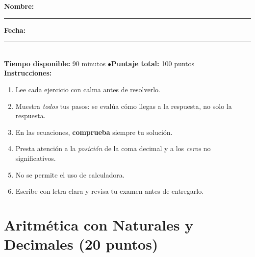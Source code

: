 \documentclass[12pt, letterpaper]{article}
\begin{document}


\vspace{4pt}
\begin{cuadroinfo}
  \small
  \textbf{Nombre:} \rule{0.55\linewidth}{0.4pt} \quad \textbf{Fecha:} \rule{0.15\linewidth}{0.4pt} \\[6pt]
  \textbf{Tiempo disponible:} 90 minutos \quad$\bullet$\quad \textbf{Puntaje total:} 100 puntos \\[4pt]
  \textbf{Instrucciones:}
  \begin{enumerate}[leftmargin=*]
    \item Lee cada ejercicio con calma antes de resolverlo.
    \item Muestra \emph{todos} tus pasos: se evalúa cómo llegas a la respuesta, no solo la respuesta.
    \item En las ecuaciones, \textbf{comprueba} siempre tu solución.
    \item Presta atención a la \emph{posición} de la coma decimal y a los \emph{ceros} no significativos.
    \item No se permite el uso de calculadora.
    \item Escribe con letra clara y revisa tu examen antes de entregarlo.
  \end{enumerate}
\end{cuadroinfo}

\vspace{8pt}

\section{Aritmética con Naturales y Decimales (20 puntos)}
\end{document}
